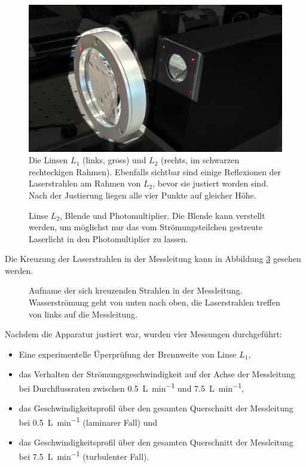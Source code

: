\begin{figure}[h!t]
    \centering
    \includegraphics[width=.67\textwidth]{images/linse.jpeg}
    \caption{%
        Die  Linsen  $L_1$ (links,  gross)  und  $L_2$ (rechts,  im  schwarzen
        rechteckigen  Rahmen). Ebenfalls  sichtbar   sind  einige  Reflexionen
        der  Laserstrahlen am  Rahmen  von $L_2$,  bevor  sie justiert  worden
        sind. Nach der Justierung liegen alle vier Punkte auf gleicher H\"ohe.
    }
    \label{fig:lensL1}
\end{figure}

\begin{figure}[h!t]
    \centering
    \resizebox{.67\textwidth}{!}{}
    \caption{%
        Linse  $L_2$, Blende  und Photomultiplier. Die  Blende kann  verstellt
        werden,  um  m\"oglichst  nur  das  vom Str\"omungsteilchen  gestreute
        Laserlicht in den Photomultiplier zu lassen.
    }
    \label{fig:versuchsanordnung:blende}
\end{figure}

Die  Kreuzung  der   Laserstrahlen  in  der  Messleitung   kann  in  Abbildung
\ref{fig:laserkreuzung} gesehen werden.

\begin{figure}[h!t]
    \centering
    \resizebox{.67\textwidth}{!}{}
    \caption{%
        Aufname      der     sich      kreuzenden     Strahlen      in     der
        Messleitung. Wasserstr\"omung   geht   von   unten  nach   oben,   die
        Laserstrahlen treffen von links auf die Messleitung.
    }
    \label{fig:laserkreuzung}
\end{figure}

Nachdem die Apparatur justiert war, wurden vier Messungen durchgef\"uhrt:

\begin{itemize}
    \item
        Eine experimentelle \"Uperpr\"ufung der Brennweite von Linse $L_1$,
    \item
        das  Verhalten  der  Str\"omungsgeschwindigkeit   auf  der  Achse  der
        Messleitung  bei Durchflussraten  zwischen \SI{0.5}{\liter\per\minute}
        und \SI{7.5}{\liter\per\minute},
    \item
        das  Geschwindigkeitsprofil   \"uber  den  gesamten   Querschnitt  der
        Messleitung bei \SI{0.5}{\liter\per\minute} (laminarer Fall) und
    \item
        das  Geschwindigkeitsprofil   \"uber  den  gesamten   Querschnitt  der
        Messleitung bei \SI{7.5}{\liter\per\minute} (turbulenter Fall).
\end{itemize}

